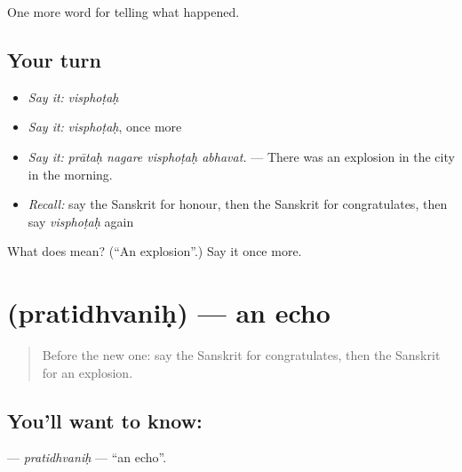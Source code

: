 \begin{grammarlens}[title={What you've built}]
One more word for telling what happened.
\end{grammarlens}

\subsection*{Your turn}
\begin{itemize}
\raggedright
  \item \emph{Say it:} \emph{visphoṭaḥ}
  \item \emph{Say it:} \emph{visphoṭaḥ}, once more
  \item \emph{Say it:} \emph{prātaḥ nagare visphoṭaḥ abhavat.} — There was an explosion in the city in the morning.
  \item \emph{Recall:} say the Sanskrit for honour, then the Sanskrit for congratulates, then say \emph{visphoṭaḥ} again
\end{itemize}

\begin{tcolorbox}[breakable,colback=teal!4,colframe=teal!35!black,title={Before you move on}]
What does  mean? (\textquotedblleft{}An explosion\textquotedblright{}.) Say it once more.
\end{tcolorbox}
\section[\texorpdfstring{\sk{प्रतिध्वनिः} (pratidhvaniḥ)}{प्रतिध्वनिः (pratidhvaniḥ)}]{ (pratidhvaniḥ) — an echo}

\label{lesson:SA-C315-pratidhvanih}



\begin{quote}
Before the new one: say the Sanskrit for congratulates, then the Sanskrit for an explosion.
\end{quote}

\subsection*{You'll want to know: }
\textbf{} — \emph{pratidhvaniḥ} — \textquotedblleft{}an echo\textquotedblright{}.

\begin{quote}
   
\end{quote}

